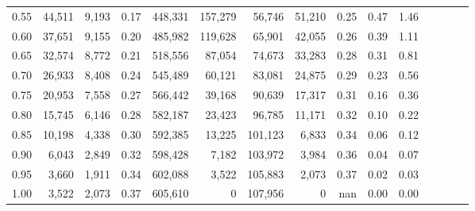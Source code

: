\begin{tabular}{rrrcrrrrrrrrrrr}
0.55 &  44,511 &  9,193 &                                       0.17 &  448,331 &  157,279 &   56,746 &   51,210 &  0.25 &  0.47 &                         1.46 \\
0.60 &  37,651 &  9,155 &                                       0.20 &  485,982 &  119,628 &   65,901 &   42,055 &  0.26 &  0.39 &                         1.11 \\
0.65 &  32,574 &  8,772 &                                       0.21 &  518,556 &   87,054 &   74,673 &   33,283 &  0.28 &  0.31 &                         0.81 \\
0.70 &  26,933 &  8,408 &                                       0.24 &  545,489 &   60,121 &   83,081 &   24,875 &  0.29 &  0.23 &                         0.56 \\
0.75 &  20,953 &  7,558 &                                       0.27 &  566,442 &   39,168 &   90,639 &   17,317 &  0.31 &  0.16 &                         0.36 \\
0.80 &  15,745 &  6,146 &                                       0.28 &  582,187 &   23,423 &   96,785 &   11,171 &  0.32 &  0.10 &                         0.22 \\
0.85 &  10,198 &  4,338 &                                       0.30 &  592,385 &   13,225 &  101,123 &    6,833 &  0.34 &  0.06 &                         0.12 \\
0.90 &   6,043 &  2,849 &                                       0.32 &  598,428 &    7,182 &  103,972 &    3,984 &  0.36 &  0.04 &                         0.07 \\
0.95 &   3,660 &  1,911 &                                       0.34 &  602,088 &    3,522 &  105,883 &    2,073 &  0.37 &  0.02 &                         0.03 \\
1.00 &   3,522 &  2,073 &                                       0.37 &  605,610 &        0 &  107,956 &        0 &   nan &  0.00 &                         0.00 \\
\bottomrule
\end{tabular}
